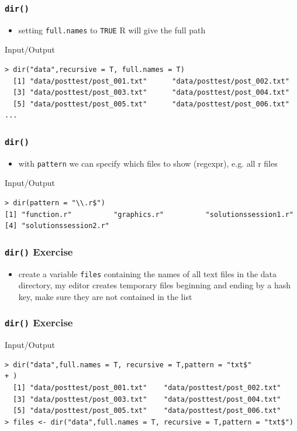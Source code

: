 \documentclass[xcolor={table},c]{beamer}
\begin{document}
\begin{frame}[fragile]\frametitle{\texttt{dir()}}
  \begin{itemize}
  \item setting \texttt{full.names} to \texttt{TRUE} R will give the full path
  \end{itemize}
  \begin{exampleblock}{Input/Output}\scriptsize
\begin{verbatim}
> dir("data",recursive = T, full.names = T)
  [1] "data/posttest/post_001.txt"      "data/posttest/post_002.txt"     
  [3] "data/posttest/post_003.txt"      "data/posttest/post_004.txt"     
  [5] "data/posttest/post_005.txt"      "data/posttest/post_006.txt"     
...
\end{verbatim}
  \end{exampleblock}
\end{frame}

\begin{frame}[fragile]\frametitle{\texttt{dir()}}
  \begin{itemize}
  \item with \texttt{pattern} we can specify which files to show (regexpr), e.g. all r files 
  \end{itemize}
  \begin{exampleblock}{Input/Output}\scriptsize
\begin{verbatim}
> dir(pattern = "\\.r$")
[1] "function.r"          "graphics.r"          "solutionssession1.r"
[4] "solutionssession2.r"
\end{verbatim}
  \end{exampleblock}
\end{frame}


\begin{frame}[fragile]\frametitle{\texttt{dir()} Exercise}
  \begin{itemize}
  \item create a variable \texttt{files} containing the names of all text files in the data directory, my editor creates temporary files beginning and ending by a hash key, make sure they are not contained in the list
  \end{itemize}
\end{frame}

\begin{frame}[fragile]\frametitle{\texttt{dir()} Exercise}
  \begin{exampleblock}{Input/Output}\scriptsize
\begin{verbatim}
> dir("data",full.names = T, recursive = T,pattern = "txt$"
+ )
  [1] "data/posttest/post_001.txt"    "data/posttest/post_002.txt"   
  [3] "data/posttest/post_003.txt"    "data/posttest/post_004.txt"   
  [5] "data/posttest/post_005.txt"    "data/posttest/post_006.txt"   
> files <- dir("data",full.names = T, recursive = T,pattern = "txt$")
\end{verbatim}
  \end{exampleblock}
\end{frame}
\end{document}
